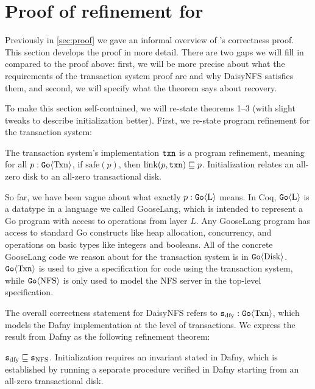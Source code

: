 \section{Proof of refinement for \sys}
\label{appendix:proof}

\setcounter{theorem}{0}

Previously in \autoref{sec:proof} we gave an informal overview of \sys's
correctness proof. This section develops the proof in more detail. There are two
gaps we will fill in compared to the proof above: first, we will be more precise
about what the requirements of the transaction system proof are and why DaisyNFS
satisfies them, and second, we will specify what the theorem says about recovery.

To make this section self-contained, we will re-state theorems 1--3 (with slight
tweaks to describe initialization better). First, we re-state program refinement
for the transaction system:

\begin{theorem}
  The transaction system's implementation $\texttt{txn}$ is a program refinement,
  meaning for all $p : \mathtt{Go}\langle \mathrm{Txn} \rangle$, if $\mathrm{safe}(p)$, then
  $\mathrm{link}(p, \texttt{txn}) \sqsubseteq p$. Initialization relates an all-zero
  disk to an all-zero transactional disk.
  \label{thm:txn-appendix}
\end{theorem}

So far, we have been vague about what exactly $p : \mathtt{Go}\langle \mathrm{L} \rangle$ means. In
Coq, $\mathtt{Go}\langle \mathrm{L} \rangle$ is a datatype in a language we called GooseLang, which is
intended to represent a Go program with access to operations from layer $L$. Any
GooseLang program has access to standard Go constructs like heap allocation,
concurrency, and operations on basic types like integers and booleans. All of
the concrete GooseLang code we reason about for the transaction system is in
$\mathtt{Go}\langle \mathrm{Disk} \rangle$. $\mathtt{Go}\langle \mathrm{Txn} \rangle$ is used to give a specification for code
using the transaction system, while $\mathtt{Go}\langle \mathrm{NFS} \rangle$ is only used to model the
NFS server in the top-level specification.

The overall correctness statement for DaisyNFS refers to
$\texttt{s}_{\mathrm{dfy}} : \mathtt{Go}\langle \mathrm{Txn} \rangle$, which models the Dafny implementation at the level
of transactions. We express the result from Dafny as the following refinement
theorem:

\begin{theorem}
  $\texttt{s}_{\mathrm{dfy}} \sqsubseteq \texttt{s}_{\mathrm{NFS}}$. Initialization requires an invariant stated in Dafny,
  which is established by running a separate  procedure verified in
  Dafny starting from an all-zero transactional disk.
  \label{thm:dafny}
\end{theorem}

